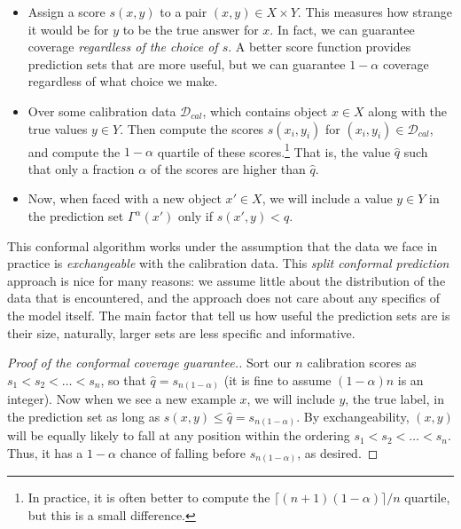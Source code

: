 \documentclass{scrartcl}
\begin{document}
\begin{itemize}
    \item Assign a score $s(x, y)$ to a pair $(x, y) \in X \times Y$. This measures how strange it would be for 
    $y$ to be the true answer for $x$. In fact, we can guarantee coverage \emph{regardless of the choice of $s$}.
    A better score function provides prediction sets that are more useful, but we can guarantee $1 - \alpha$ 
    coverage regardless of what choice we make.

    \item Over some calibration data $\mathcal{D}_{cal}$, which contains object $x \in X$ along with the true 
    values $y \in Y$. Then compute the scores $s(x_i, y_i)$ for $(x_i, y_i) \in \mathcal{D}_{cal}$, and compute the $1 - \alpha$
    quartile of these scores.\footnote{In practice, it is often better to compute the $\lceil (n + 1)(1 - \alpha) \rceil/n$ quartile, but this is a small difference.} 
    That is, the value $\hat{q}$ such that only a fraction $\alpha$ of the scores 
    are higher than $\hat{q}$.

    \item Now, when faced with a new object $x' \in X$, we will include a value $y \in Y$ in the prediction set 
    $\Gamma^{\alpha}(x')$ only if $s(x', y) < \hat{q}$.
    
\end{itemize}

This conformal algorithm works under the assumption that the data we face in practice is \emph{exchangeable}
with the calibration data. This \emph{split conformal prediction} approach is nice for many reasons: we assume little about the distribution of the data
that is encountered, and the approach does not care about any specifics of the model itself. The main factor that 
tell us how useful the prediction sets are is their size, naturally, larger sets are less specific and informative.

\begin{proof}[Proof of the conformal coverage guarantee.]
Sort our $n$ calibration scores as $s_1 < s_2 < \dots < s_n$, so that $\hat{q} = s_{n(1 - \alpha)}$ (it is fine to assume $(1 - \alpha)n$ is an integer). 
Now when we see a new example $x$, we will include $y$, the true label, in the prediction set as long as $s(x, y) \le \hat{q} = s_{n(1 - \alpha)}$. 
By exchangeability, $(x, y)$ will be equally likely to fall at any position within the ordering $s_1 < s_2 < \dots < s_n$. 
Thus, it has a $1 - \alpha$ chance of falling before $s_{n(1 - \alpha)}$, as desired.
\end{proof}
\end{document}
